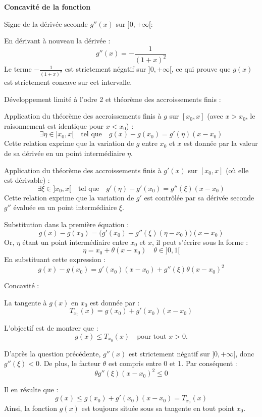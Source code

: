 \documentclass[10pt,a4paper]{article}
\begin{document}
\bigskip
\textbf{Concavité de la fonction}

\q Signe de la dérivée seconde \( g''(x) \) sur \( ]0, +\infty[ \):

En dérivant à nouveau la dérivée :
\[
g''(x) = -\frac{1}{(1+x)^2}
\]
Le terme \( -\frac{1}{(1+x)^2} \) est strictement négatif sur \( ]0, +\infty[ \), ce qui prouve que
\( g(x) \) est strictement concave sur cet intervalle.

\q Développement limité à l'odre 2 et théorème des accroissements finis :

Application du théorème des accroissements finis à \( g \) sur \( [x_0, x] \) (avec \( x > x_0 \),
le raisonnement est identique pour \( x < x_0 \)) :
\[
\exists \eta \in ]x_0, x[ \quad \text{tel que} \quad g(x) - g(x_0) = g'(\eta) (x - x_0)
\]
Cette relation exprime que la variation de \( g \) entre \( x_0 \) et \( x \) est donnée par la
valeur de sa dérivée en un point intermédiaire \( \eta \).

Application du théorème des accroissements finis à \( g'(x) \) sur \( [x_0, x] \) (où elle est
dérivable) :
\[
\exists \xi \in ]x_0, x[ \quad \text{tel que} \quad g'(\eta) - g'(x_0) = g''(\xi) (x - x_0)
\]
Cette relation exprime que la variation de \( g' \) est contrôlée par sa dérivée seconde \( g'' \)
évaluée en un point intermédiaire \( \xi \).

Substitution dans la première équation :
\[
g(x) - g(x_0) = \big( g'(x_0) + g''(\xi)(\eta - x_0) \big) (x - x_0)
\]
Or, \( \eta \) étant un point intermédiaire entre \( x_0 \) et \( x \), il peut s'écrire sous la
forme :
\[
\eta = x_0 + \theta (x - x_0) \quad \theta \in ]0,1[
\]
En substituant cette expression :
\[
g(x) - g(x_0) = g'(x_0)(x - x_0) + g''(\xi) \theta (x - x_0)^2
\]

\q Concavité :

La tangente à \( g(x) \) en \( x_0 \) est donnée par :
\[
T_{x_0}(x) = g(x_0) + g'(x_0)(x - x_0)
\]

L'objectif est de montrer que :
\[
g(x) \leq T_{x_0}(x) \quad \text{pour tout } x > 0.
\]

D'après la question précédente, \( g''(x) \) est strictement négatif sur \( ]0, +\infty[ \), donc \(
g''(\xi) < 0 \). De plus, le facteur \( \theta \) est compris entre 0 et 1. Par conséquent :
\[
\theta g''(\xi) (x - x_0)^2 \leq 0
\]

Il en résulte que :
\[
g(x) \leq g(x_0) + g'(x_0)(x - x_0) = T_{x_0}(x)
\]
Ainsi, la fonction \( g(x) \) est toujours située sous sa tangente en tout point \( x_0 \).
\end{document}
